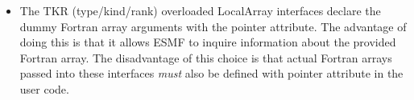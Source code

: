 
\begin{itemize}
\item The TKR (type/kind/rank) overloaded LocalArray interfaces declare the dummy Fortran array arguments with the pointer attribute. The advantage of doing this is that it allows ESMF to inquire information about the provided Fortran array. The disadvantage of this choice is that actual Fortran arrays passed into these interfaces {\em must} also be defined with pointer attribute in the user code.
\end{itemize}
